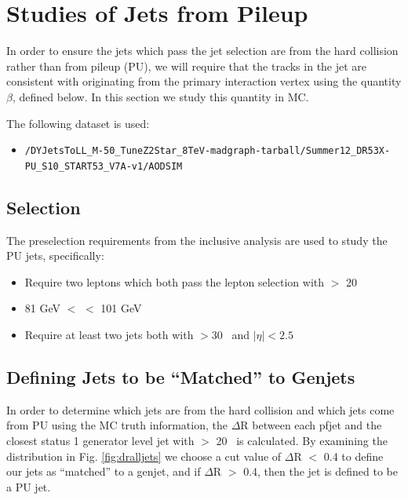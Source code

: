 \clearpage

\section{Studies of Jets from Pileup}
\label{sec:pujets}

In order to ensure the jets which pass the jet selection are from the hard collision rather than from pileup (PU), 
we will require that the tracks in the jet are consistent with originating from the primary interaction vertex
using the quantity $\beta$, defined below.
In this section we study this quantity in MC.

The following dataset is used:

\begin{itemize}
\scriptsize
\item \verb=/DYJetsToLL_M-50_TuneZ2Star_8TeV-madgraph-tarball/Summer12_DR53X-PU_S10_START53_V7A-v1/AODSIM=
\end{itemize}

\subsection{Selection}
The preselection requirements from the inclusive analysis are used to study the PU jets, specifically:

\begin{itemize}
\item Require two leptons which both pass the lepton selection with \pt $>$ 20 \GeVc 
\item 81 GeV $<$ \mll $<$ 101 GeV
\item Require at least two jets both with \pt $> 30$ \GeVc~and $|\eta| < 2.5$ 
\end{itemize}

\subsection{Defining Jets to be ``Matched'' to Genjets}
In order to determine which jets are from the hard collision and which jets come from PU using the MC truth information, the $\Delta$R between each pfjet and the closest status 1 generator level jet with \pt $>$ 20 \GeVc~is calculated. By examining the distribution in Fig. \ref{fig:dralljets} we choose a cut value of $\Delta$R $<$ 0.4 to define our jets as ``matched'' to a genjet, and if $\Delta$R $>$ 0.4, then the jet is defined to be a PU jet.

